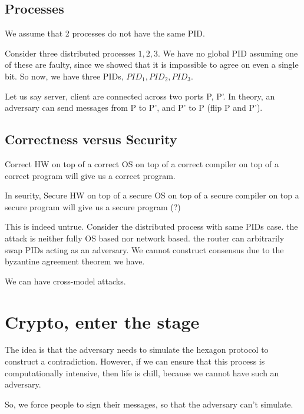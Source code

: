 \documentclass[11pt]{article}
\begin{document}
\subsection{Processes}

We assume that 2 processes do not have the same PID.


Consider three distributed processes $1, 2, 3$. We have no global PID
assuming one of these are faulty, since we showed that it is impossible to agree
on even a single bit.
So now, we have three PIDs, $PID_1, PID_2, PID_3$.


Let us say server, client are connected across two ports P, P'. In theory,
an adversary can send messages from P to P', and P' to P (flip P and P').


\subsection{Correctness versus Security}

Correct HW on top of a correct OS on top of a correct compiler on top of a 
correct program will give us a correct program.

In seurity,
Secure HW on top of a secure OS on top of a secure compiler on top a secure
program will give us a secure program (?)

This is indeed untrue.
Consider the distributed process with same PIDs case. the attack is neither
fully OS based nor network based. the router can arbitrarily swap PIDs 
acting as an adversary. We cannot construct consensus due to the byzantine
agreement theorem we have.

We can have cross-model attacks.

\section{Crypto, enter the stage}

The idea is that the adversary needs to simulate the hexagon protocol to 
construct a contradiction. However, if we can ensure that this process
is computationally intensive, then life is chill, because we cannot
have such an adversary.

So, we force people to sign their messages, so that the adversary
can't simulate.
\end{document}
